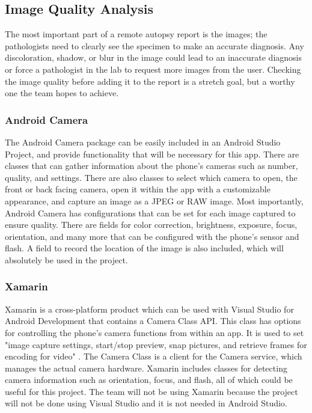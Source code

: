\documentclass[onecolumn, draftclsnofoot,10pt, compsoc]{IEEEtran}
\begin{document}
\subsection{Image Quality Analysis}
The most important part of a remote autopsy report is the images; the pathologists need to clearly see the specimen to make an accurate diagnosis. 
Any discoloration, shadow, or blur in the image could lead to an inaccurate diagnosis or force a pathologist in the lab to request more images from the user. 
Checking the image quality before adding it to the report is a stretch goal, but a worthy one the team hopes to achieve. 

\subsubsection{Android Camera}
The Android Camera package can be easily included in an Android Studio Project, and provide functionality that will be necessary for this app. 
There are classes that can gather information about the phone's cameras such as number, quality, and settings. 
There are also classes to select which camera to open, the front or back facing camera, open it within the app with a customizable appearance, and capture an image as a JPEG or RAW image. 
Most importantly, Android Camera has configurations that can be set for each image captured to ensure quality. 
There are fields for color correction, brightness, exposure, focus, orientation, and many more that can be configured with the phone's sensor and flash. 
A field to record the location of the image is also included, which will absolutely be used in the project. 
\cite{Androidcam}

\subsubsection{Xamarin}
Xamarin is a cross-platform product which can be used with Visual Studio for Android Development that contains a Camera Class API. 
This class has options for controlling the phone's camera functions from within an app. 
It is used to set "image capture settings, start/stop preview, snap pictures, and retrieve frames for encoding for video" \cite{Xamarin}. 
The Camera Class is a client for the Camera service, which manages the actual camera hardware. 
Xamarin includes classes for detecting camera information such as orientation, focus, and flash, all of which could be useful for this project. 
The team will not be using Xamarin because the project will not be done using Visual Studio and it is not needed in Android Studio. 
\cite{Xamarin}
\end{document}
